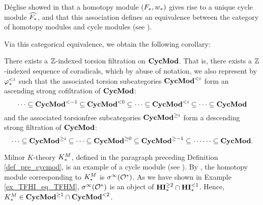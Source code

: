 D\'eglise showed in \cite{DegModHom} that a homotopy module $(F_*, 
w_*)$ gives rise to a unique cycle module $\widehat{F_*}$,
and that this association defines an equivalence between the 
category of homotopy modules and cycle modules (see 
\cite[3.7]{DegModHom}).

Via this categorical equivalence, we obtain the following
corollary: 

\begin{cor}\label{cor_tor_filt_on_CycMod}
There exists a $\mathbb{Z}$-indexed torsion filtration on $\mathbf{CycMod}$. That
is, there exists a $\mathbb{Z}$-indexed sequence of coradicals, which by abuse
of notation, we also represent by $\varphi^{< i}_{*}$ such that the 
associated torsion subcategories $\mathbf{CycMod}^{< i}$ form an ascending 
strong cofiltration of $\mathbf{CycMod}$:
\[
\cdots \subseteq \mathbf{CycMod}^{< -1} \subseteq \mathbf{CycMod}^{< 0} \subseteq \cdots 
   \subseteq \mathbf{CycMod}^{< i} \subseteq \cdots 
   \subseteq \mathbf{CycMod}
\]
and the associated torsionfree subcategories $\mathbf{CycMod}^{\geq i}$
form a descending strong filtration of $\mathbf{CycMod}$:
\[
\cdots \subseteq \mathbf{CycMod}^{\geq i} \subseteq 
   \cdots \subseteq \mathbf{CycMod}^{\geq 0} \subseteq \mathbf{CycMod}^{\geq -1} \subseteq \cdots
   \cdots \subseteq \mathbf{CycMod}.
\]
\end{cor}

\begin{ex}\label{ex_milK}
Milnor $K$-theory $K^M_*$, defined in the paragraph preceding 
Definition \ref{def_pre_cycmod}, is an example of a cycle module 
(see \cite[1.4, 2.5]{Rost96}). By \cite[3.7]{DegModHom}, the 
homotopy module corresponding to $K^M_*$ is $\sigma^\infty(\mathcal{O}^*)$. As 
we have shown in Example \ref{ex_TFHI_eq_TFHM}, $\sigma^\infty(\mathcal{O}^*)$ is 
an object of $\mathbf{HI}_*^{\geq 2} \cap \mathbf{HI}_*^{< 1}$. Hence, $K^M_*
\in \mathbf{CycMod}^{\geq 1} \cap \mathbf{CycMod}^{< 2}$.
\end{ex}

%
